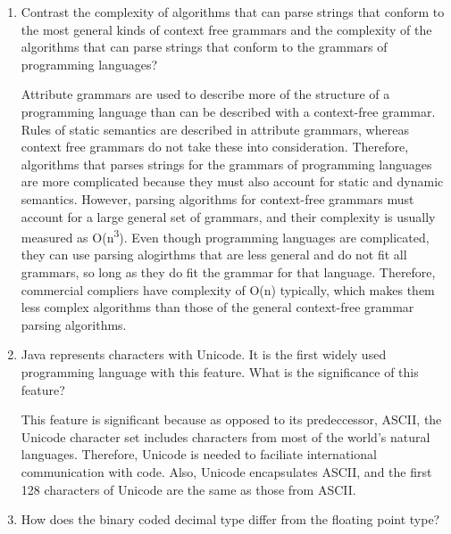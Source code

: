 \begin{enumerate}
\begin{answer}
    \end{answer}

  \item Contrast the complexity of algorithms that can parse strings
    that conform to the most general kinds of context free grammars
    and the complexity of the algorithms that can parse strings that
    conform to the grammars of programming languages?

  \begin{answer}

    Attribute grammars are used to describe more of the structure of a programming language than can be described with a context-free grammar. Rules of static semantics are described in attribute grammars, whereas context free grammars do not take these into consideration. Therefore, algorithms that parses strings for the grammars of programming languages are more complicated because they must also account for static and dynamic semantics. However, parsing algorithms for context-free grammars must account for a large general set of grammars, and their complexity is usually measured as O(n\textsuperscript{3}). Even though programming languages are complicated, they can use parsing alogirthms that are less general and do not fit all grammars, so long as they do fit the grammar for that language. Therefore, commercial compliers have complexity of O(n) typically, which makes them less complex algorithms than those of the general context-free grammar parsing algorithms.

    \end{answer}

  \item Java represents characters with Unicode. It is the first
    widely used programming language with this feature. What is the
    significance of this feature?

  \begin{answer}

    This feature is significant because as opposed to its predeccessor, ASCII, the Unicode character set includes characters from most of the world's natural languages. Therefore, Unicode is needed to faciliate international communication with code. Also, Unicode encapsulates ASCII, and the first 128 characters of Unicode are the same as those from ASCII.

    \end{answer}

  \item How does the binary coded decimal type differ from the
    floating point type?


\end{enumerate}
